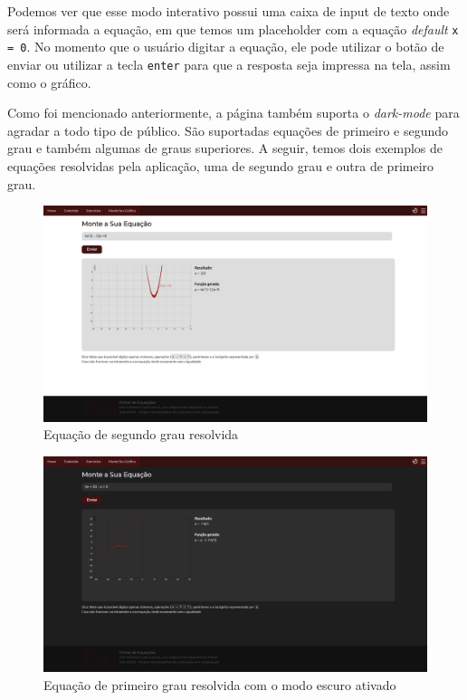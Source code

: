 \documentclass[12pt]{report}
\begin{document}
Podemos ver que esse modo interativo possui uma caixa de input de texto onde será informada a equação, em que temos um placeholder com a equação \textit{default} \texttt{x = 0}. No momento que o usuário digitar a equação, ele pode utilizar o botão de enviar ou utilizar a tecla \texttt{enter} para que a resposta seja impressa na tela, assim como o gráfico.

Como foi mencionado anteriormente, a página também suporta o \textit{dark-mode} para agradar a todo tipo de público. São suportadas equações de primeiro e segundo grau e também algumas de graus superiores. A seguir, temos dois exemplos de equações resolvidas pela aplicação, uma de segundo grau e outra de primeiro grau.

\begin{figure}[H]
    \includegraphics[width=1\textwidth]{img/aplicacao/interativo_exemplo.png}
    \caption{Equação de segundo grau resolvida}
\end{figure}

\begin{figure}[H]
    \includegraphics[width=1\textwidth]{img/aplicacao/dark_mode.png}
    \caption{Equação de primeiro grau resolvida com o modo escuro ativado}
\end{figure}
\end{document}
